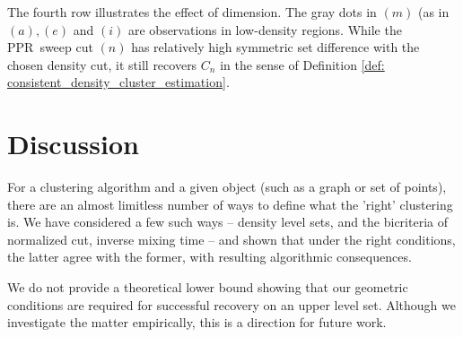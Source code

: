 \documentclass{article}
\newcommand{\1}{\mathbf{1}}
\newcommand{\pprspace}{{\sc PPR~}}
\theoremstyle{aldenthm}
\theoremstyle{aldenrmrk}
\begin{document}
The fourth row illustrates the effect of dimension. The gray dots in $(m)$ (as in $(a), (e)$ and $(i)$ are observations in low-density regions. While the \pprspace sweep cut $(n)$ has relatively high symmetric set difference with the chosen density cut, it still recovers $C_n$ in the sense of Definition \ref{def: consistent_density_cluster_estimation}.


\section{Discussion}
\label{sec: discussion}
For a clustering algorithm and a given object (such as a graph or set of points), there are an almost limitless number of ways to define what the 'right' clustering is. We have considered a few such ways -- density level sets, and the bicriteria of normalized cut, inverse mixing time -- and shown that under the right conditions, the latter agree with the former, with resulting algorithmic consequences.

We do not provide a theoretical lower bound showing that our geometric conditions are required for successful recovery on an upper level set. Although we investigate the matter empirically, this is a direction for future work.

\clearpage



\end{document}
